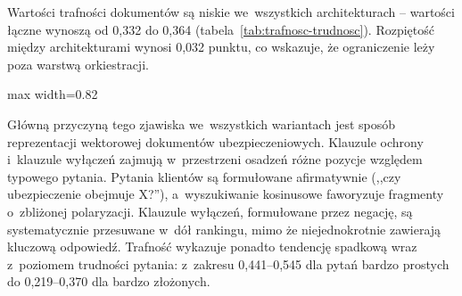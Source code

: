 Wartości trafności dokumentów są niskie we~wszystkich architekturach --
wartości łączne wynoszą od 0{,}332 do 0{,}364
(tabela~\ref{tab:trafnosc-trudnosc}). Rozpiętość między architekturami wynosi
0{,}032 punktu, co wskazuje, że ograniczenie leży poza warstwą orkiestracji.

\begin{wykres}[H]
  \caption{Trafność dokumentów według architektury}\label{wykres:trafnosc-dokumentow-per-architektura}
  \centering
  \begin{adjustbox}{max width=0.82\textwidth}
  \end{adjustbox}
\end{wykres}

Główną przyczyną tego zjawiska we~wszystkich wariantach jest sposób
reprezentacji wektorowej dokumentów ubezpieczeniowych. Klauzule ochrony
i~klauzule wyłączeń zajmują w~przestrzeni osadzeń różne pozycje względem
typowego pytania. Pytania klientów są formułowane afirmatywnie (,,czy
ubezpieczenie obejmuje X?''), a~wyszukiwanie kosinusowe faworyzuje fragmenty
o~zbliżonej polaryzacji. Klauzule wyłączeń, formułowane przez negację, są
systematycznie przesuwane w~dół rankingu, mimo że niejednokrotnie zawierają
kluczową odpowiedź. Trafność wykazuje ponadto tendencję spadkową wraz
z~poziomem trudności pytania: z~zakresu 0{,}441--0{,}545 dla pytań bardzo
prostych do 0{,}219--0{,}370 dla bardzo złożonych.

